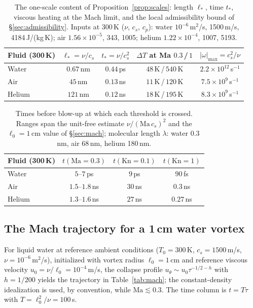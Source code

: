 \documentclass[11pt,a4paper]{article}
\begin{document}
\begin{table}[htbp]
\centering
\small
\begin{tabular}{@{}lcccc@{}}
\toprule
Fluid (300\,K) & $\ell_*=\nu/c_s$ & $t_*=\nu/c_s^2$ & $\Delta T$ at Ma $0.3$\,/\,$1$ & $|\omega|_{\max}=c_s^2/\nu$ \\
\midrule
Water  & $0.67$\,nm & $0.44$\,ps & $48$\,K\,/\,$540$\,K & $2.2\times10^{12}$\,s$^{-1}$ \\
Air    & $45$\,nm   & $0.13$\,ns & $11$\,K\,/\,$120$\,K & $7.5\times10^{9}$\,s$^{-1}$ \\
Helium & $121$\,nm  & $0.12$\,ns & $18$\,K\,/\,$195$\,K & $8.3\times10^{9}$\,s$^{-1}$ \\
\bottomrule
\end{tabular}
\caption{The one-scale content of Proposition~\ref{prop:scales}: length $\ell_*$, time $t_*$,
viscous heating at the Mach limit, and the local admissibility bound of
\S\ref{sec:admissibility}. Inputs at 300\,K ($\nu$, $c_s$, $c_p$): water $10^{-6}$\,m$^2$/s,
1500\,m/s, 4184\,J/(kg\,K); air $1.56\times10^{-5}$, 343, 1005; helium $1.22\times10^{-4}$, 1007,
5193.}
\label{tab:limits}
\end{table}

\begin{table}[htbp]
\centering
\small
\begin{tabular}{@{}lccc@{}}
\toprule
Fluid (300\,K) & $t(\mathrm{Ma}=0.3)$ & $t(\mathrm{Kn}=0.1)$ & $t(\mathrm{Kn}=1)$ \\
\midrule
Water  & $5$--$7$\,ps     & $9$\,ps  & $90$\,fs  \\
Air    & $1.5$--$1.8$\,ns & $30$\,ns & $0.3$\,ns \\
Helium & $1.3$--$1.6$\,ns & $27$\,ns & $0.27$\,ns \\
\bottomrule
\end{tabular}
\caption{Times before blow-up at which each threshold is crossed. Ranges span the unit-free
estimate $\nu/(\mathrm{Ma}\,c_s)^2$ and the $\ell_0=1$\,cm value of \S\ref{sec:mach}; molecular
length $\lambda$: water 0.3\,nm, air 68\,nm, helium 180\,nm.}
\label{tab:limits-times}
\end{table}

\subsection{The Mach trajectory for a 1\,cm water vortex}

For liquid water at reference ambient conditions ($T_0 = 300$\,K, $c_s = 1500$\,m/s, $\nu = 10^{-6}$\,m$^2$/s), initialized with vortex radius $\ell_0 = 1$\,cm and reference viscous velocity $u_0 = \nu/\ell_0 = 10^{-4}$\,m/s, the collapse profile $u_\theta \sim u_0 \tau^{-1/2-h}$ with $h = 1/200$ yields the trajectory in Table~\ref{tab:mach}; the constant-density idealization is used, by convention, while $\mathrm{Ma}\lesssim0.3$. The time column is $t=T\tau$ with $T=\ell_0^2/\nu=100$\,s.
\end{document}
